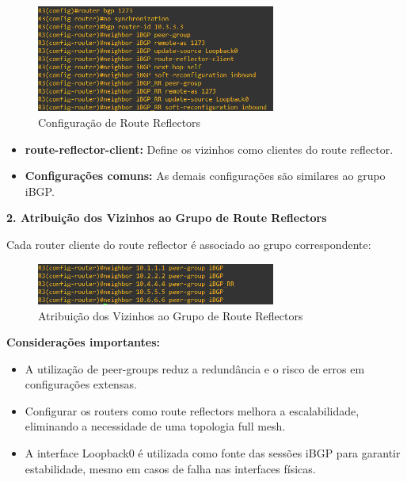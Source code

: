 \documentclass[11pt,english, openright, oneside]{book}
\begin{document}
\begin{figure}[H]
  \centering
  \includegraphics[width=0.70\textwidth]{imagens/Tarefa2/5.a.png}
  \caption{Configuração de Route Reflectors}
  \label{fig:configRR}
\end{figure}
\begin{itemize}
  \item \textbf{route-reflector-client:} Define os vizinhos como clientes do route reflector.
  \item \textbf{Configurações comuns:} As demais configurações são similares ao grupo iBGP.
\end{itemize}
\vspace{0.4cm}

\textbf{2. Atribuição dos Vizinhos ao Grupo de Route Reflectors} \par
Cada router cliente do route reflector é associado ao grupo correspondente:
\begin{figure}[H]
  \centering
  \includegraphics[width=0.70\textwidth]{imagens/Tarefa2/5.b.png}
  \caption{Atribuição dos Vizinhos ao Grupo de Route Reflectors}
  \label{fig:configRRVizinhos}
\end{figure}
\vspace{0.4cm}

\textbf{Considerações importantes:}
\begin{itemize}
  \item A utilização de peer-groups reduz a redundância e o risco de erros em configurações extensas.
  \item Configurar os routers como route reflectors melhora a escalabilidade, eliminando a necessidade de uma topologia full mesh.
  \item A interface Loopback0 é utilizada como fonte das sessões iBGP para garantir estabilidade, mesmo em casos de falha nas interfaces físicas.
\end{itemize}
\end{document}
